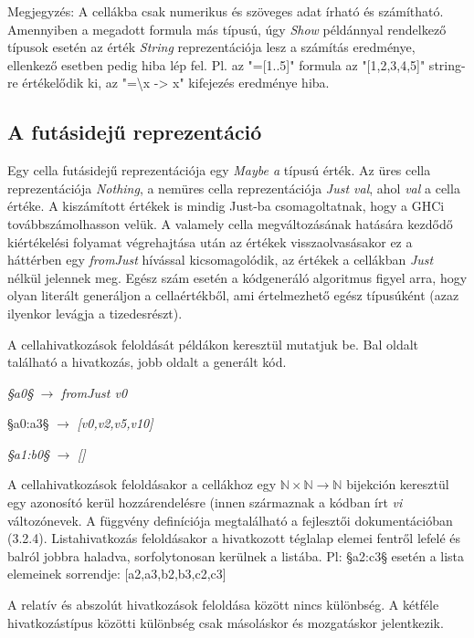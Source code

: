 Megjegyzés: A cellákba csak numerikus és szöveges adat írható és számítható. Amennyiben a megadott formula más típusú, úgy \textit{Show} példánnyal rendelkező típusok esetén az érték \textit{String} reprezentációja lesz a számítás eredménye, ellenkező esetben pedig hiba lép fel. Pl. az "=[1..5]" formula az "[1,2,3,4,5]" string-re értékelődik ki, az "=\textbackslash x -> x" kifejezés eredménye hiba.

\subsection{A futásidejű reprezentáció}

Egy cella futásidejű reprezentációja egy \textit{Maybe a} típusú érték. Az üres cella reprezentációja \textit{Nothing}, a nemüres cella reprezentációja \textit{Just val}, ahol \textit{val} a cella értéke. A kiszámított értékek is mindig Just-ba csomagoltatnak, hogy a GHCi továbbszámolhasson velük. A valamely cella megváltozásának hatására kezdődő kiértékelési folyamat végrehajtása után az értékek visszaolvasásakor ez a háttérben egy \textit{fromJust} hívással kicsomagolódik, az értékek a cellákban \textit{Just} nélkül jelennek meg.
Egész szám esetén a kódgeneráló algoritmus figyel arra, hogy olyan literált generáljon a cellaértékből, ami értelmezhető egész típusúként (azaz ilyenkor levágja a tizedesrészt).

A cellahivatkozások feloldását példákon keresztül mutatjuk be. Bal oldalt található a hivatkozás, jobb oldalt a generált kód.
\begin{compactenum}
	\item \textit{§a0§} $\rightarrow$ \textit{fromJust v0}
	\item §a0:a3§ $\rightarrow$ \textit{[v0,v2,v5,v10]}
	\item \textit{§a1:b0§} $\rightarrow$ \textit{[]}
\end{compactenum}

A cellahivatkozások feloldásakor a cellákhoz egy $\mathbb{N} \times \mathbb{N} \rightarrow \mathbb{N}$ bijekción keresztül egy azonosító kerül hozzárendelésre (innen származnak a kódban írt \textit{vi} változónevek. A függvény definíciója megtalálható a fejlesztői dokumentációban (3.2.4). Listahivatkozás feloldásakor a hivatkozott téglalap elemei fentről lefelé és balról jobbra haladva, sorfolytonosan kerülnek a listába. Pl: §a2:c3§ esetén a lista elemeinek sorrendje: [a2,a3,b2,b3,c2,c3]

A relatív és abszolút hivatkozások feloldása között nincs különbség. A kétféle hivatkozástípus közötti különbség csak másoláskor és mozgatáskor jelentkezik.

